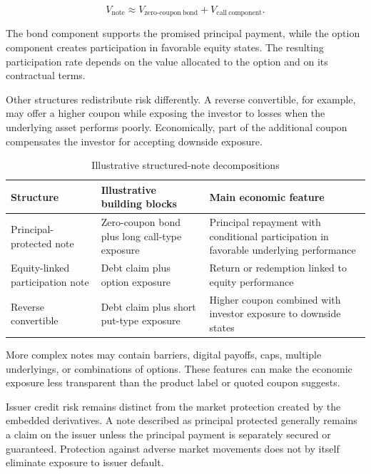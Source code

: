 \begin{equation}
V_{\mathrm{note}}
\approx
V_{\mathrm{zero\text{-}coupon\ bond}}
+
V_{\mathrm{call\ component}}.
\label{eq:ch18-principal-protected-note}
\end{equation}

The bond component supports the promised principal payment, while the option component creates participation in favorable equity states. The resulting participation rate depends on the value allocated to the option and on its contractual terms.

Other structures redistribute risk differently. A reverse convertible, for example, may offer a higher coupon while exposing the investor to losses when the underlying asset performs poorly. Economically, part of the additional coupon compensates the investor for accepting downside exposure.

\begin{table}[H]
\centering
\caption{Illustrative structured-note decompositions}
\label{tab:ch18-structured-notes}
\begin{tabularx}{\textwidth}{@{}p{3.5cm}YY@{}}
\toprule
\textbf{Structure} &
\textbf{Illustrative building blocks} &
\textbf{Main economic feature} \\
\midrule
Principal-protected note &
Zero-coupon bond plus long call-type exposure &
Principal repayment with conditional participation in favorable underlying performance \\
Equity-linked participation note &
Debt claim plus option exposure &
Return or redemption linked to equity performance \\
Reverse convertible &
Debt claim plus short put-type exposure &
Higher coupon combined with investor exposure to downside states \\
\bottomrule
\end{tabularx}
\end{table}

More complex notes may contain barriers, digital payoffs, caps, multiple underlyings, or combinations of options. These features can make the economic exposure less transparent than the product label or quoted coupon suggests.

Issuer credit risk remains distinct from the market protection created by the embedded derivatives. A note described as principal protected generally remains a claim on the issuer unless the principal payment is separately secured or guaranteed. Protection against adverse market movements does not by itself eliminate exposure to issuer default.

